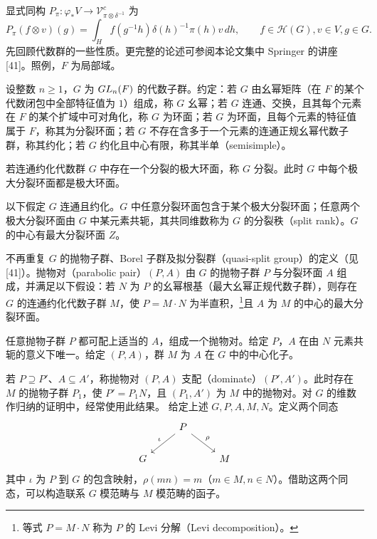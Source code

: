 显式同构 $P_\pi:\varphi_*V\to\mathcal V_{\pi\otimes\delta^{-1}}^c$ 为
\[
P_\pi(f\otimes v)(g)=\int_H f(g^{-1}h)\delta(h)^{-1}\pi(h)v\,dh,\qquad f\in\mathcal H(G),v\in V,g\in G.\tag{37}
\]
先回顾代数群的一些性质。更完整的论述可参阅本论文集中 Springer 的讲座 [41]。照例，$F$ 为局部域。

设整数 $n\geq1$，$G$ 为 $GL_n(F)$ 的代数子群。约定：若 $G$ 由幺幂矩阵（在 $F$ 的某个代数闭包中全部特征值为 $1$）组成，称 $G$ 幺幂；若 $G$ 连通、交换，且其每个元素在 $F$ 的某个扩域中可对角化，称 $G$ 为环面；若 $G$ 为环面，且每个元素的特征值属于 $F$，称其为分裂环面；若 $G$ 不存在含多于一个元素的连通正规幺幂代数子群，称其约化；若 $G$ 约化且中心有限，称其半单（semisimple）。

若连通约化代数群 $G$ 中存在一个分裂的极大环面，称 $G$ 分裂。此时 $G$ 中每个极大分裂环面都是极大环面。

以下假定 $G$ 连通且约化。$G$ 中任意分裂环面包含于某个极大分裂环面；任意两个极大分裂环面由 $G$ 中某元素共轭，其共同维数称为 $G$ 的分裂秩（split rank）。$G$ 的中心有最大分裂环面 $Z$。

不再重复 $G$ 的抛物子群、Borel 子群及拟分裂群（quasi-split group）的定义（见 [41]）。抛物对（parabolic pair）$(P,A)$ 由 $G$ 的抛物子群 $P$ 与分裂环面 $A$ 组成，并满足以下假设：若 $N$ 为 $P$ 的幺幂根基（最大幺幂正规代数子群），则存在 $G$ 的连通约化代数子群 $M$，使 $P=M\cdot N$ 为半直积，\footnote{等式 $P=M\cdot N$ 称为 $P$ 的 Levi 分解（Levi decomposition）。}且 $A$ 为 $M$ 的中心的最大分裂环面。

任意抛物子群 $P$ 都可配上适当的 $A$，组成一个抛物对。给定 $P$，$A$ 在由 $N$ 元素共轭的意义下唯一。给定 $(P,A)$，群 $M$ 为 $A$ 在 $G$ 中的中心化子。

若 $P\supseteq P'$、$A\subseteq A'$，称抛物对 $(P,A)$ 支配（dominate）$(P',A')$。此时存在 $M$ 的抛物子群 $P_1$，使 $P'=P_1N$，且 $(P_1,A')$ 为 $M$ 中的抛物对。对 $G$ 的维数作归纳的证明中，经常使用此结果。
给定上述 $G,P,A,M,N$。定义两个同态
\[
\begin{tikzcd}
&P\arrow[dl,"\iota"']\arrow[dr,"\rho"]&\\
G&&M
\end{tikzcd}
\]
其中 $\iota$ 为 $P$ 到 $G$ 的包含映射，$\rho(mn)=m$（$m\in M,n\in N$）。借助这两个同态，可以构造联系 $G$ 模范畴与 $M$ 模范畴的函子。

